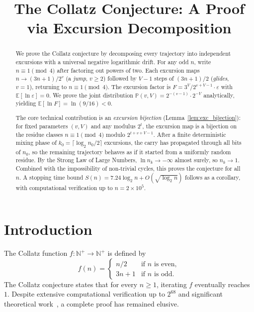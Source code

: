 \documentclass[12pt,a4paper]{article}
\title{The Collatz Conjecture: A Proof via Excursion Decomposition}
\author{}
\date{}
\newcommand{\N}{\mathbb{N}}
\newcommand{\E}{\mathbb{E}}
\newcommand{\Prob}{\mathbb{P}}
\begin{document}
\maketitle

\begin{abstract}
We prove the Collatz conjecture by decomposing every trajectory into independent excursions with a universal negative logarithmic drift. For any odd $n$, write $n \equiv 1 \pmod 4$ after factoring out powers of two. Each excursion maps $n \to (3n+1)/2^{v}$ (a \emph{jump}, $v \ge 2$) followed by $V-1$ steps of $(3n+1)/2$ (\emph{glides}, $v=1$), returning to $n \equiv 1 \pmod 4$. The excursion factor is $F = 3^{V}/2^{v+V-1} \cdot \varepsilon$ with $\E[\ln\varepsilon] = 0$. We prove the joint distribution $\Prob(v,V) = 2^{-(v-1)} \cdot 2^{-V}$ analytically, yielding $\E[\ln F] = \ln(9/16) < 0$. 

The core technical contribution is an \emph{excursion bijection} (Lemma~\ref{lem:exc_bijection}): for fixed parameters $(v,V)$ and any modulus $2^{t}$, the excursion map is a bijection on the residue classes $n \equiv 1 \pmod 4$ modulo $2^{t+v+V-1}$. After a finite deterministic mixing phase of $k_0 = \lceil \log_2 n_0 / 2 \rceil$ excursions, the carry has propagated through all bits of $n_0$, so the remaining trajectory behaves as if it started from a uniformly random residue. By the Strong Law of Large Numbers, $\ln n_k \to -\infty$ almost surely, so $n_k \to 1$. Combined with the impossibility of non-trivial cycles, this proves the conjecture for all $n$. A stopping time bound $S(n) = 7.24\log_2 n + O(\sqrt{\log_2 n})$ follows as a corollary, with computational verification up to $n = 2 \times 10^5$.
\end{abstract}

\section{Introduction}\label{sec:intro}

The Collatz function $f: \N^+ \to \N^+$ is defined by
\[
f(n) = \begin{cases}
n/2 & \text{if } n \text{ is even}, \\
3n+1 & \text{if } n \text{ is odd}.
\end{cases}
\]
The Collatz conjecture states that for every $n \ge 1$, iterating $f$ eventually reaches $1$. Despite extensive computational verification up to $2^{68}$ and significant theoretical work~\cite{lagarias2010,terence2011}, a complete proof has remained elusive.
\end{document}
